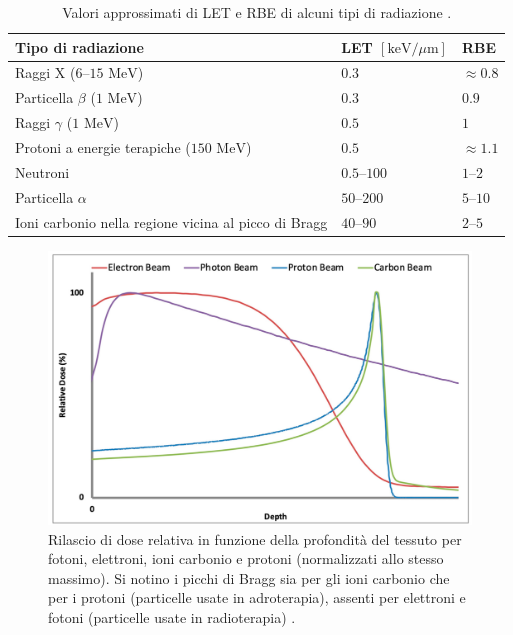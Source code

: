 \documentclass[12pt,a4paper,twoside]{report}
\begin{document}
	\begin{table}[H]
		\centering
		\begin{tabular}{ |m{9.4cm}||M{3cm}|M{1cm}| }
			\hline
			Tipo di radiazione & LET $\left[\mbox{keV/}\mu\mbox{m}\right]$ & RBE\\
			\hline\hline
			Raggi X ($6$--$15 \mbox{ MeV}$) & $0.3$ &	$\approx 0.8$\\
			\hline
			Particella $\beta$ ($1 \mbox{ MeV}$) & $0.3$ & $0.9$\\
			\hline
			Raggi $\gamma$ ($1 \mbox{ MeV}$) & $0.5$ & $1$\\
			\hline
			Protoni a energie terapiche ($150 \mbox{ MeV}$) & $0.5$ & $\approx1.1$\\
			\hline
			Neutroni & $0.5$--$100$ & $1$--$2$\\
			\hline
			Particella $\alpha$ & $50$--$200$ & $5$--$10$\\
			\hline
			Ioni carbonio nella regione vicina al picco di Bragg & $40$--$90$ & $2$--$5$\\
			\hline
		\end{tabular}
		\caption{Valori approssimati di LET e RBE di alcuni tipi di radiazione \cite{MURSHED201957}.}
		\label{tab:let_rbe}
	\end{table}
	\begin{figure}[H]
		\centering
		\includegraphics[width=0.9\linewidth]{photon.jpg}
		\caption{Rilascio di dose relativa in funzione della profondità del tessuto per fotoni, elettroni, ioni carbonio e protoni (normalizzati allo stesso massimo). Si notino i picchi di Bragg sia per gli ioni carbonio che per i protoni (particelle usate in adroterapia), assenti per elettroni e fotoni (particelle usate in radioterapia) \cite{biomedicines9010031}.}
		\label{fig:photon}
	\end{figure}
\end{document}
